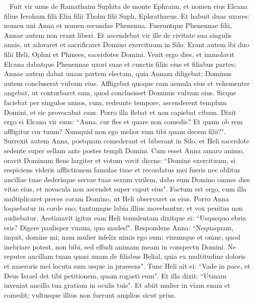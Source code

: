 
\begin{biblechapter}   
\verse Fuit vir unus de Ramathaim Suphita de monte Ephraim, et nomen eius Elcana filius Ieroham filii Eliu filii Thohu filii Suph, Ephrathaeus. 
\verse Et habuit duas uxores: nomen uni Anna et nomen secundae Phenenna. Fueruntque Phenennae filii, Annae autem non erant liberi. 
\verse Et ascendebat vir ille de civitate sua singulis annis, ut adoraret et sacrificaret Domino exercituum in Silo. Erant autem ibi duo filii Heli, Ophni et Phinees, sacerdotes Domini. 
\verse Venit ergo dies, et immolavit Elcana dabatque Phenennae uxori suae et cunctis filiis eius et filiabus partes; 
\verse Annae autem dabat unam partem electam, quia Annam diligebat; Dominus autem concluserat vulvam eius. 
\verse Affligebat quoque eam aemula eius et vehementer angebat, ut conturbaret eam, quod conclusisset Dominus vulvam eius. 
\verse Sicque faciebat per singulos annos, cum, redeunte tempore, ascenderent templum Domini, et sic provocabat eam. Porro illa flebat et non capiebat cibum. 
\verse Dixit ergo ei Elcana vir suus: “Anna, cur fles et quare non comedis? Et quam ob rem affligitur cor tuum? Numquid non ego melior sum tibi quam decem filii?". 
\verse Surrexit autem Anna, postquam comederant et biberant in Silo, et Heli sacerdote sedente super sellam ante postes templi Domini. 
\verse Cum esset Anna amaro animo, oravit Dominum flens largiter 
\verse et votum vovit dicens: “Domine exercituum, si respiciens videris afflictionem famulae tuae et recordatus mei fueris nec oblitus ancillae tuae dederisque servae tuae sexum virilem, dabo eum Domino omnes dies vitae eius, et novacula non ascendet super caput eius". 
\verse Factum est ergo, cum illa multiplicaret preces coram Domino, ut Heli observaret os eius. 
\verse Porro Anna loquebatur in corde suo; tantumque labia illius movebantur, et vox penitus non audiebatur. Aestimavit igitur eam Heli temulentam 
\verse dixitque ei: “Usquequo ebria eris? Digere paulisper vinum, quo mades!". 
\verse Respondens Anna: “Nequaquam, inquit, domine mi; nam mulier infelix nimis ego sum: vinumque et omne, quod inebriare potest, non bibi, sed effudi animam meam in conspectu Domini. 
\verse Ne reputes ancillam tuam quasi unam de filiabus Belial, quia ex multitudine doloris et maeroris mei locuta sum usque in praesens". 
\verse Tunc Heli ait ei: “Vade in pace, et Deus Israel det tibi petitionem, quam rogasti eum". 
\verse Et illa dixit: “Utinam inveniat ancilla tua gratiam in oculis tuis". Et abiit mulier in viam suam et comedit; vultusque illius non fuerunt amplius sicut prius. 

\end{biblechapter}
